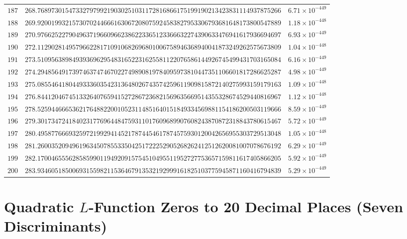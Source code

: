\documentclass[12pt,reqno]{amsart}
\theoremstyle{plain}
\theoremstyle{definition}
\theoremstyle{remark}
\begin{document}
\begin{longtable}{clc}
$187$ & $268.7689730154733279799219030251031172816866175199190213423831114937875266$ & $6.71 \times 10^{-449}$ \\
$188$ & $269.9200199321573070244666163067208075924583827953306793681648173800547889$ & $1.18 \times 10^{-448}$ \\
$189$ & $270.9766252279049637196609662386223365123366632274390633476941617936694697$ & $6.93 \times 10^{-449}$ \\
$190$ & $272.1129028149579662281710910682696801006758946368940041873249262575673809$ & $1.04 \times 10^{-448}$ \\
$191$ & $273.5109563898493936962954831652231625581122076586144926745499431703165084$ & $6.16 \times 10^{-449}$ \\
$192$ & $274.2948564917397463747467022749890819784095973810447351106601817286625287$ & $4.98 \times 10^{-449}$ \\
$193$ & $275.0855464180449333603542313648026743574259611909815872140275993159179163$ & $1.09 \times 10^{-448}$ \\
$194$ & $276.8441204674513326407659415272867236821569635669514355328674529440816967$ & $1.12 \times 10^{-448}$ \\
$195$ & $278.5259446665362176488220010523114851640151849334569881154186200503119666$ & $8.59 \times 10^{-449}$ \\
$196$ & $279.3017347241840231776964484759311017609689907608243870872318843780615467$ & $5.72 \times 10^{-449}$ \\
$197$ & $280.4958776669325972199294145217874454617874575930120042656955303729513048$ & $1.05 \times 10^{-448}$ \\
$198$ & $281.2600352094961963450785533504251722252905268262412512620081007078676192$ & $6.29 \times 10^{-449}$ \\
$199$ & $282.1700465556285859901194920915754510495511952727753657159811617405866205$ & $5.92 \times 10^{-449}$ \\
$200$ & $283.9346051850069315598211536467913532192999161825103775945871160416794839$ & $5.29 \times 10^{-449}$ \\

\end{longtable}
\normalsize
\setlength{\LTleft}{0pt}
\setlength{\LTright}{0pt}

\section{Quadratic \texorpdfstring{$L$}{L}-Function Zeros to 20 Decimal Places (Seven Discriminants)}\label{app:zero-data}
\end{document}
